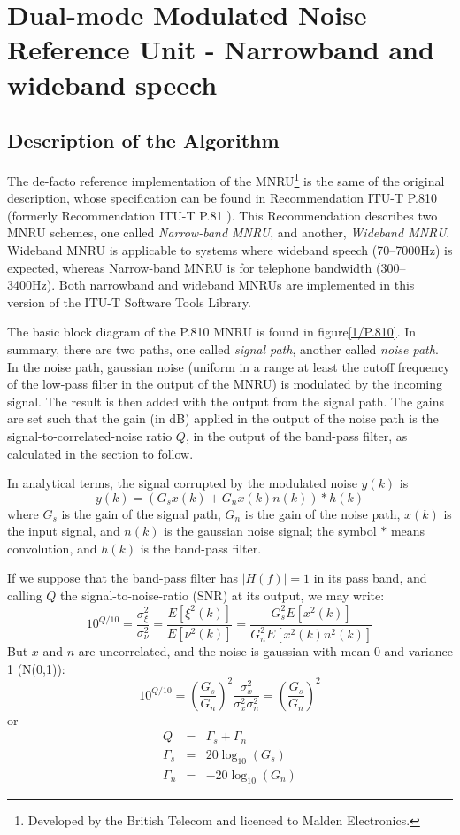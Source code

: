 \section{Dual-mode Modulated Noise Reference Unit - Narrowband and wideband speech}

\subsection{Description of the Algorithm}

The de-facto reference implementation of the MNRU\footnote{\SF Developed by the British Telecom and licenced to Malden
Electronics.} is the same of the original description, whose specification can be found in Recommendation ITU-T P.810
\cite{P.810} (formerly Recommendation ITU-T P.81 \cite{Old-P.81}).
This Recommendation describes two MNRU schemes, one called {\em Narrow-band MNRU}, and another, {\em Wideband MNRU}.
Wideband MNRU is applicable to systems where wideband speech (70--7000Hz) is expected, whereas Narrow-band MNRU is for
telephone bandwidth (300--3400Hz).
Both narrowband and wideband MNRUs are implemented in this version of the ITU-T Software Tools Library.

The basic block diagram of the P.810 MNRU is found in figure\ref{1/P.810}.
In summary, there are two paths, one called {\em signal path}, another called {\em noise path}.
In the noise path, gaussian noise (uniform in a range at least the cutoff frequency of the low-pass filter in the
output of the MNRU) is modulated by the incoming signal.
The result is then added with the output from the signal path.
The gains are set such that the gain (in dB) applied in the output of the noise path is the signal-to-correlated-noise
ratio $Q$, in the output of the band-pass filter, as calculated in the section to follow.

In analytical terms, the signal corrupted by the modulated noise $y(k)$ is
\[
       y(k) = (G_s x(k) + G_n x(k) n(k)) \ast h(k)
\]
where $G_s$ is the gain of the signal path, $G_n$ is the gain of the noise path, $x(k)$ is the input signal, and $n(k)$
is the gaussian noise signal; the symbol $\ast$ means convolution, and $h(k)$ is the band-pass filter.

If we suppose that the band-pass filter has $|H(f)|=1$ in its pass band, and calling $Q$ the signal-to-noise-ratio (SNR)
at its output, we may write:
\[
    10^{Q/10} = \frac{\sigma^2_\xi}{\sigma^2_\nu} =
                \frac{E[\xi^2(k)]}{E[\nu^2(k)]}=
                \frac{G^2_s E[x^2(k)]}{G^2_n E[x^2(k) n^2(k)]}
\]
But $x$ and $n$ are uncorrelated, and the noise is gaussian with mean 0 and variance 1 (N(0,1)):
\[
    10^{Q/10} = \left( \frac{G_s}{G_n} \right)^2
                \frac{\sigma^2_x}{\sigma^2_x \sigma^2_n} =
                \left( \frac{G_s}{G_n} \right)^2
\]
or
\[
\begin{array}{lll}
     Q &= &\Gamma_s + \Gamma_n \\
     \Gamma_s &= &20 \log_{10}(G_s)\\
     \Gamma_n &= &-20 \log_{10}(G_n)
\end{array}
\]

